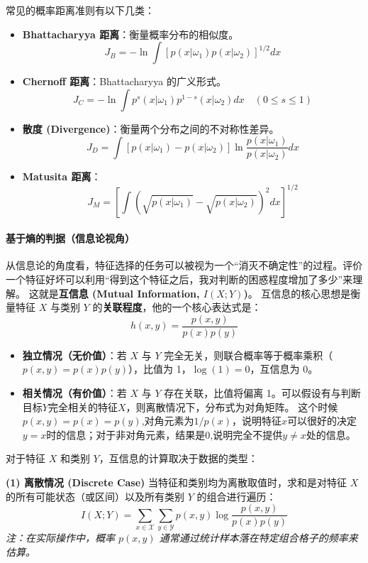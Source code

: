 常见的概率距离准则有以下几类：
\begin{itemize}
    \item \textbf{Bhattacharyya 距离}：衡量概率分布的相似度。
    \[ J_B = -\ln \int [p(x|\omega_1)p(x|\omega_2)]^{1/2} dx \]
    \item \textbf{Chernoff 距离}：Bhattacharyya 的广义形式。
    \[ J_C = -\ln \int p^s(x|\omega_1) p^{1-s}(x|\omega_2) dx \quad (0 \le s \le 1) \]
    \item \textbf{散度 (Divergence)}：衡量两个分布之间的不对称性差异。
    \[ J_D = \int [p(x|\omega_1) - p(x|\omega_2)] \ln \frac{p(x|\omega_1)}{p(x|\omega_2)} dx \]
    \item \textbf{Matusita 距离}：
    \[ J_M = \left[ \int (\sqrt{p(x|\omega_1)} - \sqrt{p(x|\omega_2)})^2 dx \right]^{1/2} \]
\end{itemize}

\paragraph{基于熵的判据（信息论视角）}

从信息论的角度看，特征选择的任务可以被视为一个“消灭不确定性”的过程。评价一个特征好坏可以利用“得到这个特征之后，我对判断的困惑程度增加了多少”来理解。
这就是\textbf{互信息 (Mutual Information, $I(X;Y)$)}。
互信息的核心思想是衡量特征 $X$ 与类别 $Y$ 的\textbf{关联程度}，他的一个核心表达式是：
\[ h(x, y) = \frac{p(x,y)}{p(x)p(y)} \]
\begin{itemize}
    \item \textbf{独立情况（无价值）}：若 $X$ 与 $Y$ 完全无关，则联合概率等于概率乘积（$p(x,y) = p(x)p(y)$），比值为 1，$\log(1)=0$，互信息为 0。
    \item \textbf{相关情况（有价值）}：若 $X$ 与 $Y$ 存在关联，比值将偏离 1。可以假设有与判断目标$Y$完全相关的特征$X$，则离散情况下，分布式为对角矩阵。
                                    这个时候$p(x, y) = p(x) = p(y)$,对角元素为$1/p(x)$，说明特征$x$可以很好的决定$y=x$时的信息；对于非对角元素，结果是0,说明完全不提供$y \neq x$处的信息。
\end{itemize}

对于特征 $X$ 和类别 $Y$，互信息的计算取决于数据的类型：

\textbf{(1) 离散情况 (Discrete Case)}
当特征和类别均为离散取值时，求和是对特征 $X$ 的所有可能状态（或区间）以及所有类别 $Y$ 的组合进行遍历：
\[ I(X;Y) = \sum_{x \in \mathcal{X}} \sum_{y \in \mathcal{Y}} p(x,y) \log \frac{p(x,y)}{p(x)p(y)} \]
\textit{注：在实际操作中，概率 $p(x,y)$ 通常通过统计样本落在特定组合格子的频率来估算。}

